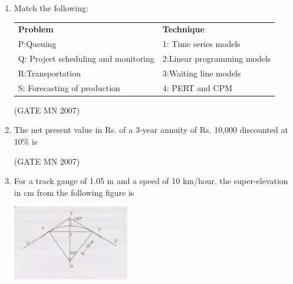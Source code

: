 \documentclass[journal]{IEEEtran}
\begin{document}
\begin{enumerate}
\item Match the following:\\
	\begin{center}
\begin{tabular}{p{4.5cm} p{6cm}}                
\textbf{Problem} & \textbf{Technique}      \\                                              
P:Queuing & 1: Time series models \\            
Q: Project scheduling and monitoring & 2:Linear programming models \\  
R:Transportation & 3:Waiting line models \\     
S: Forecasting of production & 4: PERT and CPM \\
\end{tabular}
	\end{center}

\begin{enumerate}
\end{enumerate}

\hfill (GATE MN 2007)

\item The net present value in Rs. of a 3-year annuity of Rs. 10,000 discounted at 10\% is  
\begin{enumerate}
\end{enumerate}

\hfill (GATE MN 2007)

\item For a track gauge of 1.05 m and a speed of 10 km/hour, the super-elevation in cm from the following figure is
	\begin{center}
	\includegraphics[width=0.4\textwidth]{Screenshot_2025_0812_180648.png}
	\end{center}



\end{enumerate}
\end{document}
